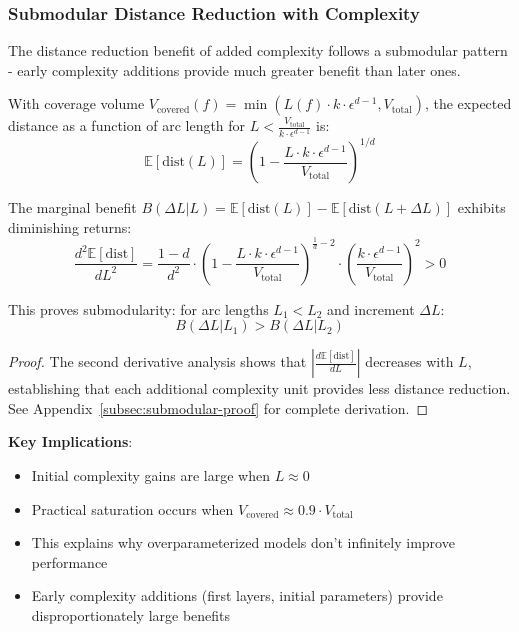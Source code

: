 \subsubsection{Submodular Distance Reduction with Complexity}

The distance reduction benefit of added complexity follows a submodular pattern - early complexity additions provide much greater benefit than later ones.

\begin{theorem}
\label{thm:submodular-reduction}
With coverage volume $V_{\text{covered}}(f) = \min(L(f) \cdot k \cdot \epsilon^{d-1}, V_{\text{total}})$, the expected distance as a function of arc length for $L < \frac{V_{\text{total}}}{k \cdot \epsilon^{d-1}}$ is:
$$\mathbb{E}[\text{dist}(L)] = \left(1 - \frac{L \cdot k \cdot \epsilon^{d-1}}{V_{\text{total}}}\right)^{1/d}$$

The marginal benefit $B(\Delta L | L) = \mathbb{E}[\text{dist}(L)] - \mathbb{E}[\text{dist}(L + \Delta L)]$ exhibits diminishing returns:
$$\frac{d^2\mathbb{E}[\text{dist}]}{dL^2} = \frac{1-d}{d^2} \cdot \left(1 - \frac{L \cdot k \cdot \epsilon^{d-1}}{V_{\text{total}}}\right)^{\frac{1}{d}-2} \cdot \left(\frac{k \cdot \epsilon^{d-1}}{V_{\text{total}}}\right)^2 > 0$$

This proves submodularity: for arc lengths $L_1 < L_2$ and increment $\Delta L$:
$$B(\Delta L | L_1) > B(\Delta L | L_2)$$
\end{theorem}

\begin{proof}
The second derivative analysis shows that $\left|\frac{d\mathbb{E}[\text{dist}]}{dL}\right|$ decreases with $L$, establishing that each additional complexity unit provides less distance reduction. See Appendix~\ref{subsec:submodular-proof} for complete derivation.
\end{proof}

\textbf{Key Implications}:
\begin{itemize}
    \item Initial complexity gains are large when $L \approx 0$
    \item Practical saturation occurs when $V_{\text{covered}} \approx 0.9 \cdot V_{\text{total}}$
    \item This explains why overparameterized models don't infinitely improve performance
    \item Early complexity additions (first layers, initial parameters) provide disproportionately large benefits
\end{itemize}

